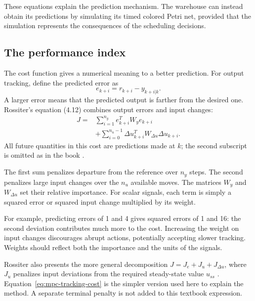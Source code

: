 These equations explain the prediction mechanism. The warehouse can instead obtain its predictions by simulating its timed colored Petri net, provided that the simulation represents the consequences of the scheduling decisions.

\subsection{The performance index}

The cost function gives a numerical meaning to a better prediction. For output tracking, define the predicted error as
\begin{equation}
    e_{k+i}=r_{k+i}-y_{k+i|k}.
\end{equation}
A larger error means that the predicted output is farther from the desired one. Rossiter's equation (4.12) combines output errors and input changes:
\begin{equation}
\begin{aligned}
    J={}&\sum_{i=1}^{n_y}e_{k+i}^{T}W_y e_{k+i}\\
        &+\sum_{i=0}^{n_u-1}
              \Delta u_{k+i}^{T}W_{\Delta u}\Delta u_{k+i}.
\end{aligned}
\label{eq:mpc-tracking-cost}
\end{equation}
All future quantities in this cost are predictions made at $k$; the second subscript is omitted as in the book \cite[Section 4.4.4, equation (4.12)]{Rossiter2018}.

The first sum penalizes departure from the reference over $n_y$ steps. The second penalizes large input changes over the $n_u$ available moves. The matrices $W_y$ and $W_{\Delta u}$ set their relative importance. For scalar signals, each term is simply a squared error or squared input change multiplied by its weight.

For example, predicting errors of 1 and 4 gives squared errors of 1 and 16: the second deviation contributes much more to the cost. Increasing the weight on input changes discourages abrupt actions, potentially accepting slower tracking. Weights should reflect both the importance and the units of the signals.

Rossiter also presents the more general decomposition $J=J_e+J_u+J_{\Delta u}$, where $J_u$ penalizes input deviations from the required steady-state value $u_{ss}$ \cite[Section 4.4.3, equation (4.9)]{Rossiter2018}. Equation~\eqref{eq:mpc-tracking-cost} is the simpler version used here to explain the method. A separate terminal penalty is not added to this textbook expression.

